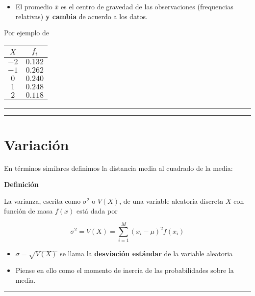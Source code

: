 \documentclass[
]{book}
\providecommand{\tightlist}{%
  \setlength{\itemsep}{0pt}\setlength{\parskip}{0pt}}
\begin{document}
\begin{itemize}
\tightlist
\item
  El promedio \(\bar{x}\) es el centro de gravedad de las observaciones (frequencias relativas) \textbf{y cambia} de acuerdo a los datos.
\end{itemize}

Por ejemplo de

\begin{longtable}[]{@{}cc@{}}
\toprule
\(X\) & \(f_i\) \\
\midrule
\endhead
\(-2\) & \(0.132\) \\
\(-1\) & \(0.262\) \\
\(0\) & \(0.240\) \\
\(1\) & \(0.248\) \\
\(2\) & \(0.118\) \\
\bottomrule
\end{longtable}

\begin{center}\rule{0.5\linewidth}{0.5pt}\end{center}

\begin{center}\rule{0.5\linewidth}{0.5pt}\end{center}

\hypertarget{variaciuxf3n}{%
\section{Variación}\label{variaciuxf3n}}

En términos similares definimos la distancia media al cuadrado de la media:

\textbf{Definición}

La varianza, escrita como \(\sigma^2\) o \(V(X)\), de una variable aleatoria discreta \(X\) con función de masa \(f(x)\) está dada por

\[\sigma^2 = V(X)= \sum_{i=1}^M (x_i-\mu)^2 f(x_i)\]

\begin{itemize}
\item
  \(\sigma=\sqrt{V(X)}\) se llama la \textbf{desviación estándar} de la variable aleatoria
\item
  Piense en ello como el momento de inercia de las probabilidades sobre la media.
\end{itemize}

\begin{center}\rule{0.5\linewidth}{0.5pt}\end{center}
\end{document}
